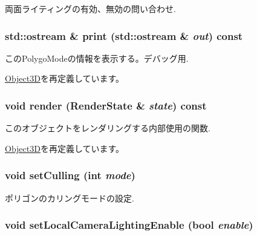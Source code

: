 両面ライティングの有効、無効の問い合わせ. \hypertarget{classm3g_1_1PolygonMode_6fea17fa1532df3794f8cb39cb4f911f}{
\subsubsection[{print}]{\setlength{\rightskip}{0pt plus 5cm}std::ostream \& print (std::ostream \& {\em out}) const}}
\label{classm3g_1_1PolygonMode_6fea17fa1532df3794f8cb39cb4f911f}


このPolygoModeの情報を表示する。デバッグ用. 

\hyperlink{classm3g_1_1Object3D_6fea17fa1532df3794f8cb39cb4f911f}{Object3D}を再定義しています。\hypertarget{classm3g_1_1PolygonMode_8babc8a79b78615da51161e94029eea9}{
\subsubsection[{render}]{\setlength{\rightskip}{0pt plus 5cm}void render ({\bf RenderState} \& {\em state}) const}}
\label{classm3g_1_1PolygonMode_8babc8a79b78615da51161e94029eea9}


このオブジェクトをレンダリングする内部使用の関数. 

\hyperlink{classm3g_1_1Object3D_8babc8a79b78615da51161e94029eea9}{Object3D}を再定義しています。\hypertarget{classm3g_1_1PolygonMode_55b3fc23392376c00748d68bdf44ca60}{
\subsubsection[{setCulling}]{\setlength{\rightskip}{0pt plus 5cm}void setCulling (int {\em mode})}}
\label{classm3g_1_1PolygonMode_55b3fc23392376c00748d68bdf44ca60}


ポリゴンのカリングモードの設定. \hypertarget{classm3g_1_1PolygonMode_232d4cff53e6fc4863e144dc61e9465c}{
\subsubsection[{setLocalCameraLightingEnable}]{\setlength{\rightskip}{0pt plus 5cm}void setLocalCameraLightingEnable (bool {\em enable})}}
\label{classm3g_1_1PolygonMode_232d4cff53e6fc4863e144dc61e9465c}


